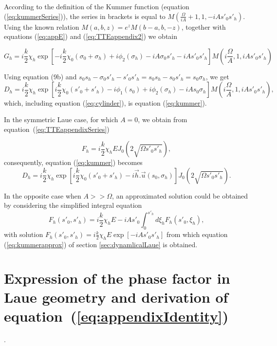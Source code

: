 \documentclass[preprint]{iucr}              %
\newcommand{\ingreen}[1]{{\color{green}#1}}
\begin{document}
According to the definition of the Kummer function (equation (\ref{eq:kummerSeries})), the series in brackets is equal to $M(\frac{\Omega}{iA}+1, 1, -iA s'_0 s'_h)$. Using the known relation
$M(a,b,z)=e^z M(b-a,b,-z)$, together with equations (\ref{eq:appE}) and (\ref{eq:TTEappendix2}) we obtain

\begin{equation}
    G_h = i\frac{k}{2}\chi_h \exp\left[-i \frac{k}{2} \chi_0 (\sigma_0+\sigma_h)+ i \phi_2(\sigma_h)-i A \sigma_0 s'_h - i A s'_0 s'_h\right] M(i\frac{\Omega}{A},1,i A s'_0 s'_h)
\end{equation}

Using equation (9b) and $s_0s_h-\sigma_0 s'_h - s'_0 s'_h=s_0 s_h - s_0 s'_h = s_0 \sigma_h$, we get
\begin{equation}
    D_h = i \frac{k}{2} \chi_h \exp\left[  i \frac{k}{2} \chi_0 (s'_0+s'_h) - i\phi_1(s_0) + i \phi_2(\sigma_h) - iA s_0 \sigma_h \right] M(i\frac{\Omega}{A},1,i A s'_0 s'_h), 
\end{equation}
which, including equation (\ref{eq:cylinder}), is equation (\ref{eq:kummer}).

In the symmetric Laue case, for which $A=0$, we obtain from equation~(\ref{eq:TTEappendixSeries})

\begin{equation}
    F_h = i \frac{k}{2} \chi_h E J_0(2 \sqrt{\Omega s'_0 s'_h}),
\end{equation}
consequently, equation (\ref{eq:kummer}) becomes
\begin{equation}
    D_h = i \frac{k}{2} \chi_h \exp\left[  i \frac{k}{2} \chi_0 (s'_0+s'_h) - i \vec h . \vec u(s_0,\sigma_h) \right] J_0(2\sqrt{\Omega s'_0 s'_h}).
\end{equation}


In the opposite case when $A >> \Omega$, an approximated solution could be obtained by considering the simplified integral equation
\begin{equation}
        F_h(s'_0,s'_h) = i\frac{k}{2}\chi_h E - i A s'_0 \int_0^{s'_h} d\xi_h F_h(s'_0,\xi_h),
\end{equation}
with solution $F_h(s'_0,s'_h) = i\frac{k}{2}\chi_h E \exp[-i A s'_0 s'_h]$ from which equation (\ref{eq:kummerapprox}) of section \ref{sec:dynamlicalLaue} is obtained.


\section{Expression of the phase factor in Laue \ingreen{geometry} and derivation of equation~(\ref{eq:appendixIdentity})}
\label{appendix:Deformation}.
\end{document}
